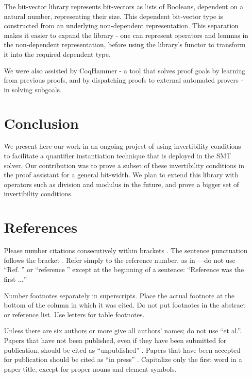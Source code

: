 \documentclass[conference]{IEEEtran}
\begin{document}
The bit-vector library represents bit-vectors as 
lists of Booleans, dependent on a natural number, 
representing their size. This dependent bit-vector 
type is constructed from an underlying non-dependent 
representation. This separation makes it easier to 
expand the library - one can represent operators 
and lemmas in the non-dependent representation, 
before using the library's functor to transform it 
into the required dependent type. 

We were also assisted by CoqHammer - a tool that 
solves proof goals by learning from previous proofs, 
and by dispatching proofs to external automated provers
 - in solving subgoals.
 
\section{Conclusion}
\label{conc}
 We present here our work in an ongoing 
project of using invertibility conditions to facilitate a 
quantifier instantiation technique that is deployed in 
the \cvcfour SMT solver. Our contribution was to 
prove a subset of these invertibility conditions in the 
\coq proof assistant for a general bit-width. We plan 
to extend this library with operators such as division and 
modulus in the future, and prove a bigger set of invertibility conditions. 


\section*{References}

Please number citations consecutively within brackets \cite{b1}. The 
sentence punctuation follows the bracket \cite{b2}. Refer simply to the reference 
number, as in \cite{b3}---do not use ``Ref. \cite{b3}'' or ``reference \cite{b3}'' except at 
the beginning of a sentence: ``Reference \cite{b3} was the first $\ldots$''

Number footnotes separately in superscripts. Place the actual footnote at 
the bottom of the column in which it was cited. Do not put footnotes in the 
abstract or reference list. Use letters for table footnotes.

Unless there are six authors or more give all authors' names; do not use 
``et al.''. Papers that have not been published, even if they have been 
submitted for publication, should be cited as ``unpublished'' \cite{b4}. Papers 
that have been accepted for publication should be cited as ``in press'' \cite{b5}. 
Capitalize only the first word in a paper title, except for proper nouns and 
element symbols.
\end{document}
